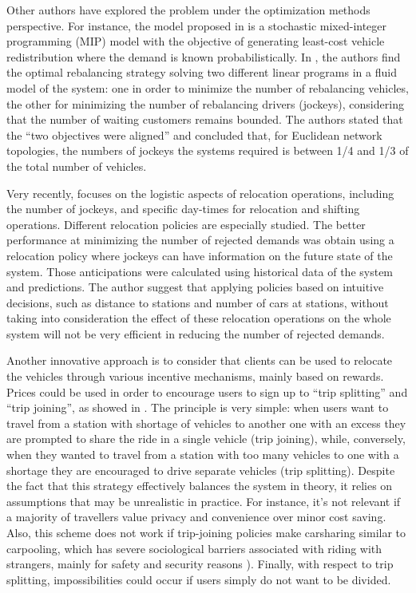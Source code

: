 \begin{bibunit}[ieeetr]
\medskip
Other authors have explored the problem under the optimization methods perspective.
For instance, the model proposed in \cite{nair_fleet_2011} is a stochastic mixed-integer programming (MIP) model with the objective of generating least-cost vehicle redistribution where the demand is known probabilistically.
In \cite{smith_rebalancing_2013}, the authors find the optimal rebalancing strategy solving two different linear programs in a fluid model of the system: one in order to minimize the number of rebalancing vehicles, the other for minimizing the number of rebalancing drivers (jockeys), considering that the number of waiting customers remains bounded.
The authors stated that the ``two objectives were aligned'' and concluded that, for Euclidean network topologies, the numbers of jockeys the systems required is between 1/4 and 1/3 of the total number of vehicles.

\medskip
Very recently, \cite{zakaria_optimization_2015} focuses on the logistic aspects of relocation operations, including the number of jockeys, and specific day-times for relocation and shifting operations.
Different relocation policies are especially studied.
The better performance at minimizing the number of rejected demands was obtain using a relocation policy where jockeys can have information on the future state of the system.
Those anticipations were calculated using historical data of the system and predictions. %
The author suggest that applying policies based on intuitive decisions, such as distance to stations and number of cars at stations, without taking into consideration the effect of these relocation operations on the whole system will not be very efficient in reducing the number of rejected demands.

\medskip
Another innovative approach is to consider that clients can be used to relocate the vehicles through various incentive mechanisms, mainly based on rewards.
Prices could be used in order to encourage users to sign up to ``trip splitting'' and ``trip joining'', as showed in \cite{barth_user_based_2004}.
The principle is very simple: when users want to travel from a station with shortage of vehicles to another one with an excess they are prompted to share the ride in a single vehicle (trip joining), while, conversely, when they wanted to travel from a station with too many vehicles to one with a shortage they are encouraged to drive separate vehicles (trip splitting).
Despite the fact that this strategy effectively balances the system in theory, it relies on assumptions that may be unrealistic in practice.
For instance, it's not relevant if a majority of travellers value privacy and convenience over minor cost saving.
Also, this scheme does not work if trip-joining policies make carsharing similar to carpooling, which has severe sociological barriers associated with riding with strangers, mainly for safety and security reasons \cite{chan_ridesharing_2012, correia_carpooling_2011}).
Finally, with respect to trip splitting, impossibilities could occur if users simply do not want to be divided.



\end{bibunit}

